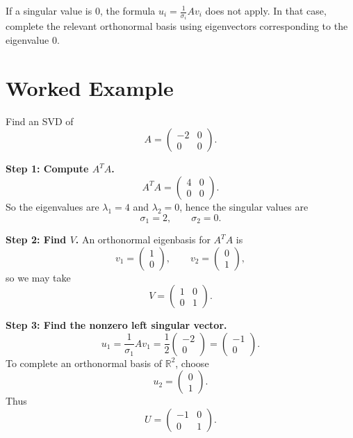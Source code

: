 \begin{remark}
If a singular value is $0$, the formula $u_i=\frac{1}{\sigma_i}Av_i$ does not apply. In that case, complete the relevant orthonormal basis using eigenvectors corresponding to the eigenvalue $0$.
\end{remark}

\section{Worked Example}

Find an SVD of
\[
A=\begin{pmatrix}
-2 & 0\\
0 & 0
\end{pmatrix}.
\]

\textbf{Step 1: Compute $A^TA$.}
\[
A^TA=
\begin{pmatrix}
4 & 0\\
0 & 0
\end{pmatrix}.
\]
So the eigenvalues are $\lambda_1=4$ and $\lambda_2=0$, hence the singular values are
\[
\sigma_1=2,\qquad \sigma_2=0.
\]

\textbf{Step 2: Find $V$.}
An orthonormal eigenbasis for $A^TA$ is
\[
v_1=\begin{pmatrix}1\\0\end{pmatrix},
\qquad
v_2=\begin{pmatrix}0\\1\end{pmatrix},
\]
so we may take
\[
V=\begin{pmatrix}
1 & 0\\
0 & 1
\end{pmatrix}.
\]

\textbf{Step 3: Find the nonzero left singular vector.}
\[
u_1=\frac{1}{\sigma_1}Av_1
=\frac{1}{2}\begin{pmatrix}-2\\0\end{pmatrix}
=\begin{pmatrix}-1\\0\end{pmatrix}.
\]
To complete an orthonormal basis of $\mathbb{R}^2$, choose
\[
u_2=\begin{pmatrix}0\\1\end{pmatrix}.
\]
Thus
\[
U=\begin{pmatrix}
-1 & 0\\
0 & 1
\end{pmatrix}.
\]

